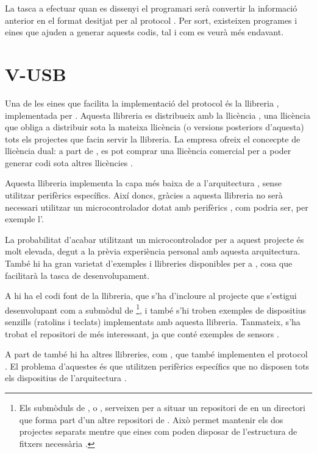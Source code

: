La tasca a efectuar quan es dissenyi el programari serà convertir la
informació anterior en el format desitjat per al protocol . Per sort,
existeixen programes i eines que ajuden a generar aquests codis, tal i com
es veurà més endavant.

\section{V-USB}

Una de les eines que facilita la implementació del protocol  és la
llibreria , implementada per 
\cite{Vusb}. Aquesta llibreria
es distribueix amb la llicència , una llicència que obliga a
distribuir sota la mateixa llicència (o versions posteriors d'aquesta) tots els
projectes que facin servir la llibreria. La empresa ofreix el concecpte de
llicència dual: a part de , es pot comprar una llicència comercial
per a poder generar codi sota altres llicències \cite{VusbLicensing}.

Aquesta llibreria implementa la capa més baixa de  a l'arquitectura
, sense utilitzar perifèrics específics. Així doncs, gràcies a aquesta
llibreria no serà necessari utilitzar un microcontrolador  dotat amb
perifèrics , com podria ser, per exemple l'.

La probabilitat d'acabar utilitzant un microcontrolador  per a aquest
projecte és molt elevada, degut a la prèvia experiència personal amb aquesta
arquitectura. També hi ha gran varietat d'exemples i llibreries disponibles per
a , cosa que facilitarà la tasca de desenvolupament.

A \cite{Vusb} hi ha el codi font de la llibreria, que s'ha d'incloure al
projecte que s'estigui desenvolupant com a submòdul de 
\footnote{
    Els submòduls de , o , serveixen per a
    situar un repositori de  en un directori que forma part d'un altre
    repositori de . Això permet mantenir els dos projectes separats
    mentre que eines com  poden disposar de l'estructura de
    fitxers necessària \cite{GitSubmodule}.
}, i també s'hi troben exemples de dispositius
senzills (ratolins i teclats) implementats amb aquesta llibreria. Tanmateix,
s'ha trobat el repositori de \cite{VusbProjects} més interessant, ja que conté
exemples de sensors .

A part de  també hi ha altres llibreries, com , que també
implementen el protocol . El problema d'aquestes és que utilitzen
perifèrics específics que no disposen tots els dispositius de l'arquitectura 
 \cite{Lufa}.

